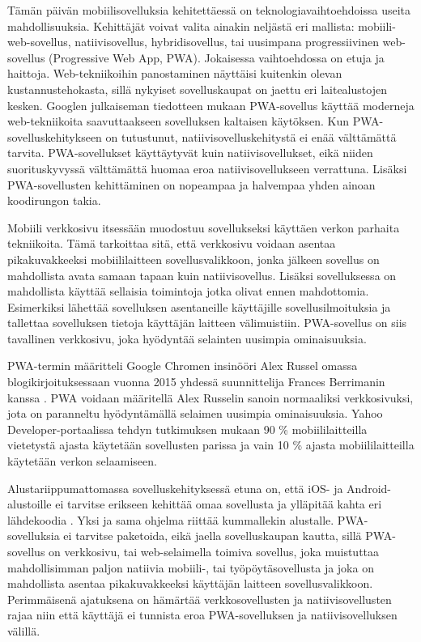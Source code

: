 \documentclass{tktltiki}
\begin{document}
Tämän päivän mobiilisovelluksia kehitettäessä on teknologiavaihtoehdoissa useita mahdollisuuksia. Kehittäjät voivat valita ainakin neljästä eri mallista: mobiili-web-sovellus, natiivisovellus, hybridisovellus, tai uusimpana progressiivinen web-sovellus (Progressive Web App, PWA). Jokaisessa vaihtoehdossa on etuja ja haittoja. Web-tekniikoihin panostaminen näyttäisi kuitenkin olevan kustannustehokasta, sillä nykyiset sovelluskaupat on jaettu eri laitealustojen kesken. Googlen julkaiseman tiedotteen mukaan \cite{Gambhir} PWA-sovellus käyttää moderneja web-tekniikoita saavuttaakseen sovelluksen kaltaisen käytöksen. Kun PWA-sovelluskehitykseen on tutustunut, natiivisovelluskehitystä ei enää välttämättä tarvita. PWA-sovellukset käyttäytyvät kuin natiivisovellukset, eikä niiden suorituskyvyssä välttämättä huomaa eroa natiivisovellukseen verrattuna. Lisäksi PWA-sovellusten kehittäminen on nopeampaa ja halvempaa yhden ainoan koodirungon takia. 

Mobiili verkkosivu itsessään muodostuu sovellukseksi käyttäen verkon parhaita tekniikoita. Tämä tarkoittaa sitä, että verkkosivu voidaan asentaa pikakuvakkeeksi mobiililaitteen sovellusvalikkoon, jonka jälkeen sovellus on mahdollista avata samaan tapaan kuin natiivisovellus. Lisäksi sovelluksessa on mahdollista käyttää sellaisia toimintoja jotka olivat ennen mahdottomia. Esimerkiksi lähettää sovelluksen asentaneille käyttäjille sovellusilmoituksia ja tallettaa sovelluksen tietoja käyttäjän laitteen välimuistiin. PWA-sovellus on siis tavallinen verkkosivu, joka hyödyntää selainten uusimpia ominaisuuksia.

PWA-termin määritteli Google Chromen insinööri Alex Russel \cite{Russell, biorn2017progressive} omassa blogikirjoituksessaan vuonna 2015 yhdessä suunnittelija Frances Berrimanin kanssa \cite{tandelimpact}. PWA voidaan määritellä Alex Russelin sanoin normaaliksi verkkosivuksi, jota on paranneltu hyödyntämällä selaimen uusimpia ominaisuuksia. Yahoo Developer-portaalissa tehdyn tutkimuksen mukaan \cite{Khalaf} 90 \% mobiililaitteilla vietetystä ajasta käytetään sovellusten parissa ja vain 10 \% ajasta mobiililaitteilla käytetään verkon selaamiseen. 

Alustariippumattomassa sovelluskehityksessä etuna on, että iOS- ja Android-alustoille ei tarvitse erikseen kehittää omaa sovellusta ja ylläpitää kahta eri lähdekoodia \cite{xanthopoulos2013comparative}. Yksi ja sama ohjelma riittää kummallekin alustalle. PWA-sovelluksia ei tarvitse paketoida, eikä jaella sovelluskaupan kautta, sillä PWA-sovellus on verkkosivu, tai web-selaimella toimiva sovellus, joka muistuttaa mahdollisimman paljon natiivia mobiili-, tai työpöytäsovellusta ja joka on mahdollista asentaa pikakuvakkeeksi käyttäjän laitteen sovellusvalikkoon. Perimmäisenä ajatuksena on hämärtää verkkosovellusten ja natiivisovellusten rajaa niin että käyttäjä ei tunnista eroa PWA-sovelluksen ja natiivisovelluksen välillä.
\end{document}

